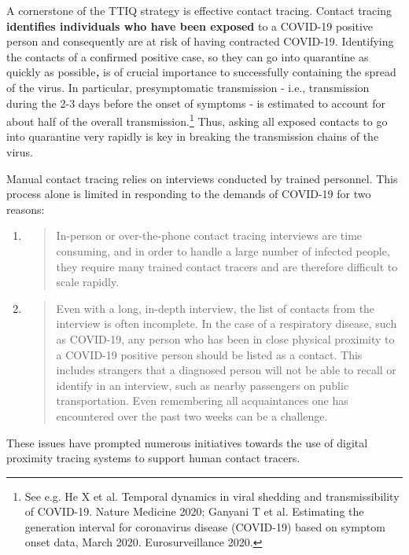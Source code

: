 \documentclass{article}
\begin{document}
A cornerstone of the TTIQ strategy is effective contact tracing. Contact
tracing \textbf{identifies individuals who have been exposed} to a
COVID-19 positive person and consequently are at risk of having
contracted COVID-19. Identifying the contacts of a confirmed positive
case, so they can go into quarantine as quickly as
possible\emph{\textbf{,}} is of crucial importance to successfully
containing the spread of the virus. In particular, presymptomatic
transmission - i.e., transmission during the 2-3 days before the onset
of symptoms - is estimated to account for about half of the overall
transmission.\footnote{See e.g. He X et al. Temporal dynamics in viral
  shedding and transmissibility of COVID-19. Nature Medicine 2020;
  Ganyani T et al. Estimating the generation interval for coronavirus
  disease (COVID-19) based on symptom onset data, March 2020.
  Eurosurveillance 2020.} Thus, asking all exposed contacts to go into
quarantine very rapidly is key in breaking the transmission chains of
the virus.

Manual contact tracing relies on interviews conducted by trained
personnel. This process alone is limited in responding to the demands of
COVID-19 for two reasons:

\begin{enumerate}
\def\labelenumi{\arabic{enumi})}
\item
  \begin{quote}
  In-person or over-the-phone contact tracing interviews are time
  consuming, and in order to handle a large number of infected people,
  they require many trained contact tracers and are therefore difficult
  to scale rapidly.
  \end{quote}
\item
  \begin{quote}
  Even with a long, in-depth interview, the list of contacts from the
  interview is often incomplete. In the case of a respiratory disease,
  such as COVID-19, any person who has been in close physical proximity
  to a COVID-19 positive person should be listed as a contact. This
  includes strangers that a diagnosed person will not be able to recall
  or identify in an interview, such as nearby passengers on public
  transportation. Even remembering all acquaintances one has encountered
  over the past two weeks can be a challenge.
  \end{quote}
\end{enumerate}

These issues have prompted numerous initiatives towards the use of
digital proximity tracing systems to support human contact tracers.
\end{document}
